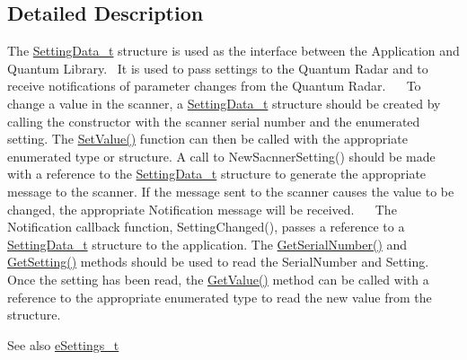 \subsection{Detailed Description}
The \mbox{\hyperlink{struct_quantum_lib_1_1_setting_data__t}{Setting\+Data\+\_\+t}} structure is used as the interface between the Application and Quantum Library.~\newline
It is used to pass settings to the Quantum Radar and to receive notifications of parameter changes from the Quantum Radar.~\newline
~\newline
To change a value in the scanner, a \textquotesingle{}\mbox{\hyperlink{struct_quantum_lib_1_1_setting_data__t}{Setting\+Data\+\_\+t}}\textquotesingle{} structure should be created by calling the constructor with the scanner serial number and the enumerated setting. The \textquotesingle{}\mbox{\hyperlink{struct_quantum_lib_1_1_setting_data__t_afbf4f07b95c1ef9d35bfdf8a362bd2e2}{Set\+Value()}}\textquotesingle{} function can then be called with the appropriate enumerated type or structure. A call to \textquotesingle{}New\+Sacnner\+Setting()\textquotesingle{} should be made with a reference to the \textquotesingle{}\mbox{\hyperlink{struct_quantum_lib_1_1_setting_data__t}{Setting\+Data\+\_\+t}}\textquotesingle{} structure to generate the appropriate message to the scanner. If the message sent to the scanner causes the value to be changed, the appropriate Notification message will be received.~\newline
~\newline
The Notification callback function, Setting\+Changed(), passes a reference to a \textquotesingle{}\mbox{\hyperlink{struct_quantum_lib_1_1_setting_data__t}{Setting\+Data\+\_\+t}}\textquotesingle{} structure to the application. The \textquotesingle{}\mbox{\hyperlink{struct_quantum_lib_1_1_setting_data__t_a884208dbd84bede1bb678526f18c98b7}{Get\+Serial\+Number()}}\textquotesingle{} and \textquotesingle{}\mbox{\hyperlink{struct_quantum_lib_1_1_setting_data__t_a35a86a3ade9011cba431902b12ead85a}{Get\+Setting()}}\textquotesingle{} methods should be used to read the Serial\+Number and Setting. Once the setting has been read, the \textquotesingle{}\mbox{\hyperlink{struct_quantum_lib_1_1_setting_data__t_ab53eb949027f8789ad32988ca2e7c6f4}{Get\+Value()}}\textquotesingle{} method can be called with a reference to the appropriate enumerated type to read the new value from the structure.~\newline
\begin{DoxySeeAlso}{See also}
\mbox{\hyperlink{namespace_quantum_lib_acc8124e3e65bca4aa798d03a55e3d54c}{e\+Settings\+\_\+t}} 
\end{DoxySeeAlso}


